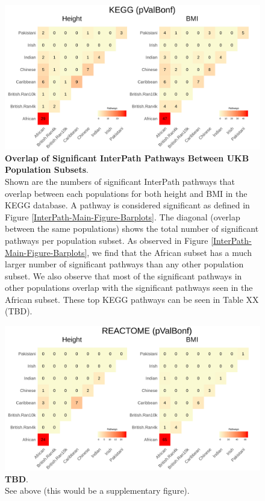 \documentclass[12pt, a4paper]{article}
\begin{document}
\begin{figure}[htbp]
\centering
\includegraphics[scale=.225]{Images/InterPath_Main_Figure_Heatplots_KEGG_vs1.png}
\caption[TBD]{\textbf{Overlap of Significant InterPath Pathways Between UKB Population Subsets}. \\ Shown are the numbers of significant InterPath pathways that overlap between each populations for both height and BMI in the KEGG database. A pathway is considered significant as defined in Figure \ref{InterPath-Main-Figure-Barplots}. The diagonal (overlap between the same populations) shows the total number of significant pathways per population subset. As observed in Figure \ref{InterPath-Main-Figure-Barplots}, we find that the African subset has a much larger number of significant pathways than any other population subset. We also observe that most of the significant pathways in other populations overlap with the significant pathways seen in the African subset. These top KEGG pathways can be seen in Table XX (TBD).}
\label{InterPath-Main-Figure-Heatplots-KEGG}
\end{figure}
\begin{figure}[htbp]
\centering
\includegraphics[scale=.225]{Images/InterPath_Main_Figure_Heatplots_REACTOME_vs1.png}
\caption[TBD]{\textbf{TBD}. \\ See above (this would be a supplementary figure).}
\label{InterPath-Main-Figure-Heatplots-REACTOME}
\end{figure}
\end{document}
